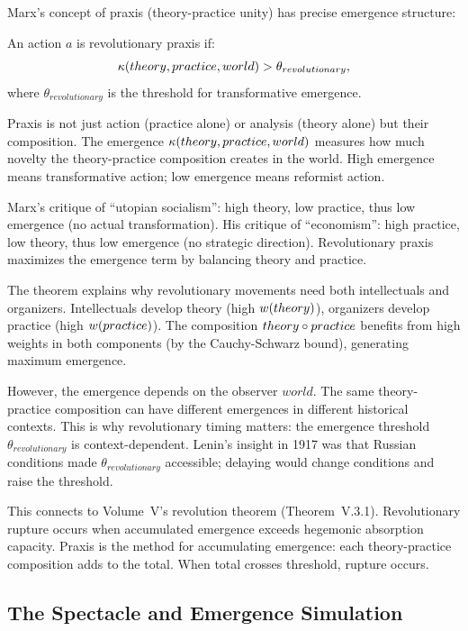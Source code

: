 Marx's concept of praxis (theory-practice unity) has precise emergence structure:

\begin{theorem}
\label{thm:revolutionary-praxis}
An action $a$ is revolutionary praxis if:
\[
  \kappa(theory, practice, world) > \theta_{revolutionary},
\]
where $\theta_{revolutionary}$ is the threshold for transformative emergence.
\end{theorem}

\begin{interpretation}
Praxis is not just action (practice alone) or analysis (theory alone) but their
composition. The emergence $\kappa(theory, practice, world)$ measures how much
novelty the theory-practice composition creates in the world. High emergence
means transformative action; low emergence means reformist action.

Marx's critique of ``utopian socialism'': high theory, low practice, thus low
emergence (no actual transformation). His critique of ``economism'': high
practice, low theory, thus low emergence (no strategic direction). Revolutionary
praxis maximizes the emergence term by balancing theory and practice.

The theorem explains why revolutionary movements need both intellectuals and
organizers. Intellectuals develop theory (high $w(theory)$), organizers
develop practice (high $w(practice)$). The composition $theory \circ practice$
benefits from high weights in both components (by the Cauchy-Schwarz bound),
generating maximum emergence.

However, the emergence depends on the observer $world$. The same theory-practice
composition can have different emergences in different historical contexts. This
is why revolutionary timing matters: the emergence threshold $\theta_{revolutionary}$
is context-dependent. Lenin's insight in 1917 was that Russian conditions made
$\theta_{revolutionary}$ accessible; delaying would change conditions and raise
the threshold.

This connects to Volume~V's revolution theorem (Theorem~V.3.1). Revolutionary
rupture occurs when accumulated emergence exceeds hegemonic absorption capacity.
Praxis is the method for accumulating emergence: each theory-practice composition
adds to the total. When total crosses threshold, rupture occurs.
\end{interpretation}

\subsection{The Spectacle and Emergence Simulation}


